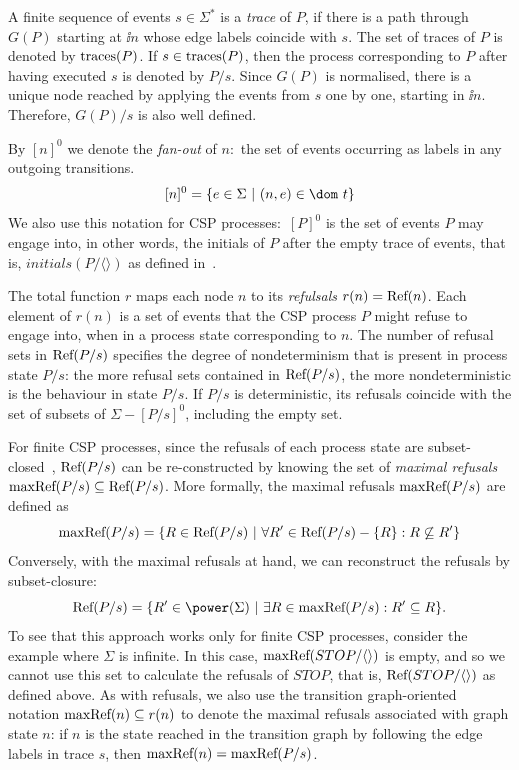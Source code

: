 A finite sequence of events $s\in\Sigma^*$ is a \emph{trace} of $P$, if there
is a path through $G(P)$ starting  at $\ii n$ whose edge labels coincide with
$s$. The set of traces of $P$ is denoted by $\text{traces}(P)$. If $s\in\text{traces}(P)$, then
the process corresponding to $P$ after having executed $s$ is denoted by
$P/s$. Since $G(P)$ is normalised, there is a unique node reached by applying
the events from $s$ one by one, starting in $\ii n$. Therefore, $G(P)/s$  is
also well defined.

By $[n]^0$ we denote the \emph{fan-out} of $n$:~the set of events occurring
as labels in any outgoing transitions.
$$
[n]^0 = \{ e\in\Sigma~|~(n,e)\in\dom~t \}
$$
We also use this notation for CSP processes:~$[P]^0$ is the set
of events $P$ may engage into, in other words, the initials of $P$ after the
empty trace of events, that is, $initials(P/\langle\rangle)$ as defined
in~\cite{Roscoe2010}.

The total function $r$ maps each node $n$ to its \emph{refulsals} $r(n) =
\text{Ref}(n)$. Each element of $r(n)$ is a set of events that the CSP process $P$
might refuse to engage into, when in a process state corresponding to $n$.
The number of refusal sets in $\text{Ref}(P/s)$ specifies the degree of
nondeterminism that is present in process state $P/s$: the more refusal sets
contained in  $\text{Ref}(P/s)$, the more nondeterministic is the behaviour in
state $P/s$. If $P/s$ is deterministic, its refusals coincide with the set of
subsets of $\Sigma - [P/s]^0$, including the empty set.

For finite CSP processes, since the refusals of each process state are
subset-closed~\cite{Hoare:1985:CSP:3921,Roscoe2010}, $\text{Ref}(P/s)$ can be
re-constructed by knowing the set of \emph{maximal refusals}
$\text{maxRef}(P/s)\subseteq\text{Ref}(P/s)$. More formally, the maximal refusals
$\text{maxRef}(P/s)$ are defined as
$$
\text{maxRef}(P/s) = \{ R \in\text{Ref}(P/s)~|~\forall R'\in \text{Ref}(P/s) - \{ R\}: R \not\subseteq R'\}
$$
Conversely, with the maximal refusals at hand, we can reconstruct the refusals by subset-closure:
$$
\refs(P/s) = \{ R'\in\power(\Sigma)~|~\exists R\in \maxrefs(P/s): R'\subseteq R \}.
$$
To see that this approach works only for finite CSP processes, consider the
example where $\Sigma$ is infinite. In this case,
$\text{maxRef}(STOP/\langle\rangle)$ is empty, and so we cannot use this set to
calculate the refusals of $STOP$, that is, $\text{Ref}(STOP/\langle\rangle)$ as
defined above. As with refusals, we also use the transition graph-oriented
notation $\text{maxRef}(n) \subseteq r(n)$ to denote the maximal refusals
associated with graph state $n$: if $n$ is the state reached in the
transition graph by following the edge labels in trace $s$, then $\text{maxRef}(n)
= \text{maxRef}(P/s)$.

